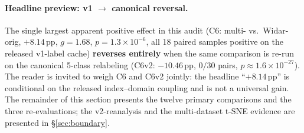 \documentclass[11pt]{article}
\theoremstyle{definition}
\newcommand{\Rx}{\text{Rx}}
\begin{document}
\paragraph{Headline preview: v1 $\rightarrow$ canonical reversal.}
The single largest apparent positive effect in this audit (C6: multi-\Rx{} vs.\ Widar-orig, $+8.14$\,pp, $g = 1.68$, $p = 1.3\times10^{-6}$, all 18 paired samples positive on the released v1-label cache) \textbf{reverses entirely} when the same comparison is re-run on the canonical 5-class relabeling (C6v2: $-10.46$\,pp, $0/30$ pairs, $p \approx 1.6\times10^{-27}$). The reader is invited to weigh C6 and C6v2 jointly: the headline ``$+8.14$\,pp'' is conditional on the released index--domain coupling and is not a universal gain. The remainder of this section presents the twelve primary comparisons and the three re-evaluations; the v2-reanalysis and the multi-dataset t-SNE evidence are presented in \S\ref{sec:boundary}.
\end{document}
